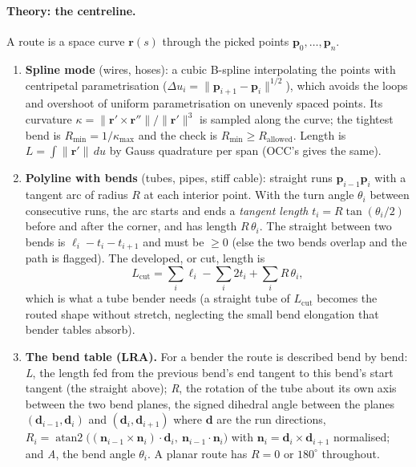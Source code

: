 \paragraph{Theory: the centreline.} A route is a space curve $\mathbf r(s)$ through the picked points
$\mathbf p_0,\dots,\mathbf p_n$.
\begin{enumerate}
  \item \textbf{Spline mode} (wires, hoses): a cubic B-spline interpolating the points with centripetal
        parametrisation ($\Delta u_i=\|\mathbf p_{i+1}-\mathbf p_i\|^{1/2}$), which avoids the loops and overshoot of
        uniform parametrisation on unevenly spaced points. Its curvature
        $\kappa=\|\mathbf r'\times\mathbf r''\|/\|\mathbf r'\|^3$ is sampled along the curve; the tightest bend
        is $R_{\min}=1/\kappa_{\max}$ and the check is $R_{\min}\ge R_{\text{allowed}}$. Length is
        $L=\int\|\mathbf r'\|\,du$ by Gauss quadrature per span (OCC's  gives the same).
  \item \textbf{Polyline with bends} (tubes, pipes, stiff cable): straight runs $\mathbf p_{i-1}\mathbf p_i$ with a
        tangent arc of radius $R$ at each interior point. With the turn angle $\theta_i$ between consecutive runs,
        the arc starts and ends a \emph{tangent length} $t_i=R\tan(\theta_i/2)$ before and after the corner,
        and has length $R\,\theta_i$. The straight between two bends is $\ell_i-t_i-t_{i+1}$ and must be
        $\ge0$ (else the two bends overlap and the path is flagged). The developed, or cut, length is
        \[
          L_{\text{cut}}=\sum_i \ell_i-\sum_i 2t_i+\sum_i R\,\theta_i ,
        \]
        which is what a tube bender needs (a straight tube of $L_{\text{cut}}$ becomes the routed shape without
        stretch, neglecting the small bend elongation that bender tables absorb).
  \item \textbf{The bend table (LRA).} For a bender the route is described bend by bend: \emph{L}, the length fed
        from the previous bend's end tangent to this bend's start tangent (the straight above); \emph{R}, the rotation
        of the tube about its own axis between the two bend planes, the signed dihedral angle between the planes
        $(\mathbf d_{i-1},\mathbf d_i)$ and $(\mathbf d_i,\mathbf d_{i+1})$ where $\mathbf d$ are the run directions,
        $R_i=\operatorname{atan2}\big((\mathbf n_{i-1}\times\mathbf n_i)\cdot\mathbf d_i,\ \mathbf n_{i-1}\cdot\mathbf n_i\big)$
        with $\mathbf n_i=\mathbf d_i\times\mathbf d_{i+1}$ normalised; and \emph{A}, the bend angle $\theta_i$.
        A planar route has $R=0$ or $180^\circ$ throughout.
\end{enumerate}

